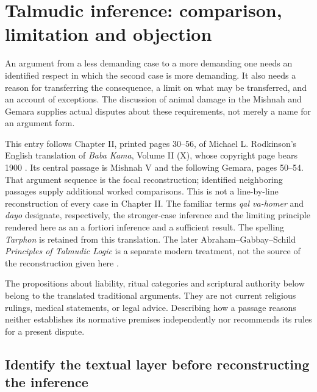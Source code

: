 \section{Talmudic inference: comparison, limitation and objection}
\label{sec:p18-talmudic-inference-principles}

An argument from a less demanding case to a more demanding one needs an
identified respect in which the second case is more demanding. It also
needs a reason for transferring the consequence, a limit on what may be
transferred, and an account of exceptions. The discussion of animal
damage in the Mishnah and Gemara supplies actual disputes about these
requirements, not merely a name for an argument form.

This entry follows Chapter II, printed pages 30--56, of Michael L.
Rodkinson's English translation of \emph{Baba Kama}, Volume II (X),
whose copyright page bears 1900
\parencite[pp.~30--56]{RodkinsonBabaKamaCopyright1900}.
Its central passage is Mishnah V and the following Gemara, pages 50--54.
That argument sequence is the focal reconstruction; identified neighboring
passages supply additional worked comparisons. This is not a line-by-line
reconstruction of every case in Chapter II.
The familiar terms \emph{qal va-homer} and \emph{dayo} designate,
respectively, the stronger-case inference and the limiting principle
rendered here as an a fortiori inference and a sufficient result.
The spelling \emph{Tarphon} is retained from this translation.
The later Abraham--Gabbay--Schild \emph{Principles of Talmudic Logic}
is a separate modern treatment, not the source of the reconstruction
given here \cite{AbrahamGabbaySchild2018PrinciplesMetadata}.

The propositions about liability, ritual categories and scriptural
authority below belong to the translated traditional arguments.
They are not current religious rulings, medical statements, or legal
advice. Describing how a passage reasons neither establishes its
normative premises independently nor recommends its rules for a
present dispute.

\subsection{Identify the textual layer before reconstructing the inference}
\label{sec:p18-talmudic-textual-layer}

